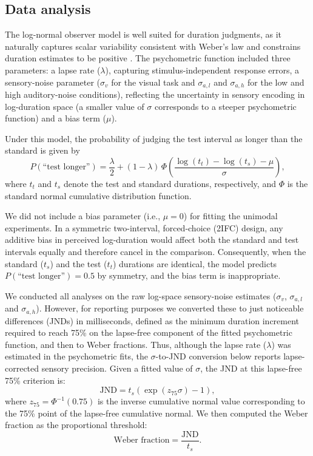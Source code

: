 \documentclass{jov}
\providecommand{\citep}[1]{\cite{#1}}
\begin{document}
\subsection{Data analysis}

The log-normal observer model is well suited for duration judgments, as it naturally captures scalar variability consistent with Weber's law and constrains duration estimates to be positive \citep{haigh2021role}. The psychometric function included three parameters: a lapse rate ($\lambda$), capturing stimulus-independent response errors, a sensory-noise parameter ($\sigma_v$ for the visual task and $\sigma_{a,l}$ and $\sigma_{a,h}$ for the low and high auditory-noise conditions), reflecting the uncertainty in sensory encoding in log-duration space (a smaller value of $\sigma$ corresponds to a steeper psychometric function) and a bias term ($\mu$).

Under this model, the probability of judging the test interval as longer than the standard is given by
\begin{equation}
P(\text{``test longer''}) = \frac{\lambda}{2} + (1-\lambda)\,
\Phi\!\left(\frac{\log(t_t)-\log(t_s)-\mu}{\sigma}\right),
\end{equation}
where $t_t$ and $t_s$ denote the test and standard durations, respectively, and $\Phi$ is the standard normal cumulative distribution function.

We did not include a bias parameter (i.e., $\mu=0$) for fitting the unimodal experiments. In a symmetric two-interval, forced-choice (2IFC) design, any additive bias in perceived log-duration would affect both the standard and test intervals equally and therefore cancel in the comparison. Consequently, when  the standard ($t_s$) and the test ($t_t$) durations are identical, the model predicts $P(\text{``test longer''}) = 0.5$ by symmetry, and the bias term is inappropriate. 

We conducted all analyses on the raw log-space sensory-noise estimates ($\sigma_v$, $\sigma_{a,l}$ and $\sigma_{a,h}$). However, for reporting purposes we converted these to just noticeable differences (JNDs) in milliseconds, defined as the minimum duration increment required to reach 75\% on the lapse-free component of the fitted psychometric function, and then to Weber fractions. Thus, although the lapse rate ($\lambda$) was estimated in the psychometric fits, the $\sigma$-to-JND conversion below reports lapse-corrected sensory precision. Given a fitted value of $\sigma$, the JND at this lapse-free 75\% criterion is:
\begin{equation}
\text{JND} = t_s \left( \exp\left(z_{75}\sigma\right) - 1 \right),
\label{sigma2JND_eq}
\end{equation}
where $z_{75} = \Phi^{-1}(0.75)$ is the inverse cumulative normal value corresponding to the 75\% point of the lapse-free cumulative normal. We then computed the Weber fraction as the proportional threshold:
\begin{equation}
\text{Weber fraction} = \frac{\text{JND}}{t_s}.
\label{WF_eq}
\end{equation}
\end{document}
